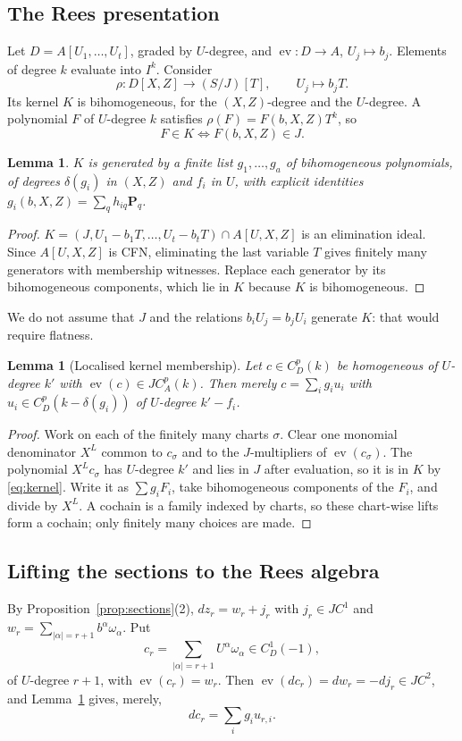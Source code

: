 \documentclass[11pt]{amsart}
\numberwithin{equation}{section}
\newtheorem{lemma}[theorem]{Lemma}
\theoremstyle{definition}
\theoremstyle{remark}
\DeclareMathOperator{\ev}{ev}
\begin{document}
\subsection{The Rees presentation}
Let $D=A[U_1,\ldots,U_t]$, graded by $U$-degree, and
$\ev:D\to A$, $U_j\mapsto b_j$. Elements of degree $k$ evaluate into
$I^k$. Consider
\[
 \rho:D[X,Z]\longrightarrow(S/J)[T],\qquad U_j\longmapsto b_jT .
\]
Its kernel $K$ is bihomogeneous, for the $(X,Z)$-degree and the
$U$-degree. A polynomial $F$ of $U$-degree $k$ satisfies
$\rho(F)=F(b,X,Z)T^k$, so
\begin{equation}\label{eq:kernel}
 F\in K\iff F(b,X,Z)\in J .
\end{equation}

\begin{lemma}
$K$ is generated by a finite list $g_1,\ldots,g_a$ of bihomogeneous
polynomials, of degrees $\delta(g_i)$ in $(X,Z)$ and $f_i$ in $U$, with
explicit identities $g_i(b,X,Z)=\sum_q h_{iq}\mathbf P_q$.
\end{lemma}
\begin{proof}
$K=(J,U_1-b_1T,\ldots,U_t-b_tT)\cap A[U,X,Z]$ is an elimination ideal.
Since $A[U,X,Z]$ is CFN, eliminating the last variable $T$ gives
finitely many generators with membership witnesses. Replace each
generator by its bihomogeneous components, which lie in $K$ because
$K$ is bihomogeneous.
\end{proof}

We do not assume that $J$ and the relations $b_iU_j=b_jU_i$ generate
$K$: that would require flatness.

\begin{lemma}[Localised kernel membership]\label{lem:localised}
Let $c\in C^p_D(k)$ be homogeneous of $U$-degree $k'$ with
$\ev(c)\in JC^p_A(k)$. Then merely $c=\sum_ig_iu_i$ with
$u_i\in C^p_D(k-\delta(g_i))$ of $U$-degree $k'-f_i$.
\end{lemma}
\begin{proof}
Work on each of the finitely many charts $\sigma$. Clear one monomial
denominator $X^L$ common to $c_\sigma$ and to the $J$-multipliers of
$\ev(c_\sigma)$. The polynomial $X^Lc_\sigma$ has $U$-degree $k'$ and
lies in $J$ after evaluation, so it is in $K$ by \eqref{eq:kernel}.
Write it as $\sum g_iF_i$, take bihomogeneous components of the $F_i$,
and divide by $X^L$. A cochain is a family indexed by charts, so these
chart-wise lifts form a cochain; only finitely many choices are made.
\end{proof}

\subsection{Lifting the sections to the Rees algebra}
By Proposition~\ref{prop:sections}(2), $dz_r=w_r+j_r$ with $j_r\in JC^1$
and $w_r=\sum_{|\alpha|=r+1}b^\alpha\omega_\alpha$. Put
\[
 c_r=\sum_{|\alpha|=r+1}U^\alpha\omega_\alpha\in C^1_D(-1),
\]
of $U$-degree $r+1$, with $\ev(c_r)=w_r$. Then
$\ev(dc_r)=dw_r=-dj_r\in JC^2$, and Lemma~\ref{lem:localised} gives,
merely,
\begin{equation}\label{eq:lift}
 dc_r=\sum_ig_iu_{r,i}.
\end{equation}
\end{document}
